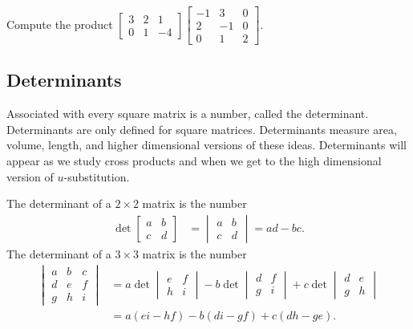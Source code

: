 \begin{problem} Compute the product
$\begin{bmatrix}
3 & 2& 1\\
0 & 1& -4
\end{bmatrix}
\begin{bmatrix}
-1&3 &0 \\
 2&-1 &0\\
 0&1 &2
\end{bmatrix}$.
\end{problem}


\subsection{Determinants}


Associated with every square matrix is a number, called the determinant.  Determinants are only defined for square matrices.
Determinants measure area, volume, length, and higher dimensional versions of these ideas.  Determinants will appear as we study cross products and when we get to the high dimensional version of {$u$}-substitution.
\begin{definition}
The determinant of a {$2\times 2$} matrix is the number 
\begin{align*}
\det\begin{bmatrix}a&b\\c&d\end{bmatrix} &=\begin{vmatrix}a&b\\c&d\end{vmatrix} = ad-bc.
\end{align*}
The determinant of a {$3\times 3$} matrix is the number 
\begin{align*}
\begin{vmatrix}a&b&c\\d&e&f\\g&h&i\end{vmatrix} &= a\det\begin{vmatrix}e&f\\h&i\end{vmatrix} -b\det\begin{vmatrix}d&f\\g&i\end{vmatrix} +c\det\begin{vmatrix}d&e\\g&h\end{vmatrix}\\
&=a(ei-hf)-b(di-gf)+c(dh-ge).
\end{align*}
\end{definition}

